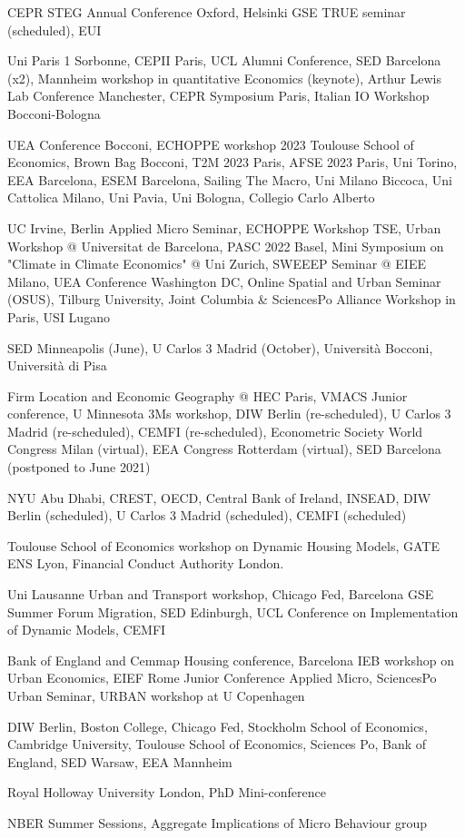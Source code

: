 \documentclass[letterpaper]{article}
\renewenvironment{itemize}{
  \begin{list}{}{
    \setlength{\leftmargin}{1.5em}
  }
}{
  \end{list}
}
\begin{document}
\begin{itemize}
\item[2025:] CEPR STEG Annual Conference Oxford, Helsinki GSE TRUE seminar (scheduled), EUI
\item[2024:] Uni Paris 1 Sorbonne, CEPII Paris, UCL Alumni Conference, SED Barcelona (x2), Mannheim workshop in quantitative Economics (keynote), Arthur Lewis Lab Conference Manchester, CEPR Symposium Paris, Italian IO Workshop Bocconi-Bologna
\item[2023:] UEA Conference Bocconi, ECHOPPE workshop 2023 Toulouse School of Economics, Brown Bag Bocconi, T2M 2023 Paris, AFSE 2023 Paris, Uni Torino, EEA Barcelona, ESEM Barcelona, Sailing The Macro, Uni Milano Biccoca, Uni Cattolica Milano, Uni Pavia, Uni Bologna, Collegio Carlo Alberto 
\item[2022:] UC Irvine, Berlin Applied Micro Seminar, ECHOPPE Workshop TSE, Urban Workshop @ Universitat de Barcelona, PASC 2022 Basel, Mini Symposium on "Climate in Climate Economics" @ Uni Zurich, SWEEEP Seminar @ EIEE Milano, UEA Conference Washington DC, Online Spatial and Urban Seminar (OSUS), Tilburg University, Joint Columbia \& SciencesPo Alliance Workshop in Paris, USI Lugano    
\item[2021:] SED Minneapolis (June), U Carlos 3 Madrid (October), Università Bocconi, Università di Pisa
\item[2020:] Firm Location and Economic Geography @ HEC Paris, VMACS Junior conference, U Minnesota 3Ms workshop, DIW Berlin (re-scheduled), U Carlos 3 Madrid (re-scheduled), CEMFI (re-scheduled), Econometric Society World Congress Milan (virtual), EEA Congress Rotterdam (virtual), SED Barcelona (postponed to June 2021)
\item[2019:] NYU Abu Dhabi, CREST, OECD, Central Bank of Ireland, INSEAD, DIW Berlin (scheduled), U Carlos 3 Madrid (scheduled), CEMFI (scheduled)
\item[2018:] Toulouse School of Economics workshop on Dynamic Housing Models, GATE ENS Lyon, Financial Conduct Authority London.
\item[2017:] Uni Lausanne Urban and Transport workshop, Chicago Fed, Barcelona GSE Summer Forum Migration, SED Edinburgh, UCL Conference on Implementation of Dynamic Models, CEMFI
\item[2016:] Bank of England and Cemmap Housing conference, Barcelona IEB workshop on Urban Economics, EIEF Rome Junior Conference Applied Micro, SciencesPo Urban Seminar, URBAN workshop at U Copenhagen
\item[2015:] DIW Berlin, Boston College, Chicago Fed, Stockholm School of Economics, Cambridge University, Toulouse School of Economics, Sciences Po, Bank of England, SED Warsaw, EEA Mannheim
\item[2014:] Royal Holloway University London, PhD Mini-conference
\item[2013:] NBER Summer Sessions, Aggregate Implications of Micro Behaviour group
\end{itemize}
\end{document}

